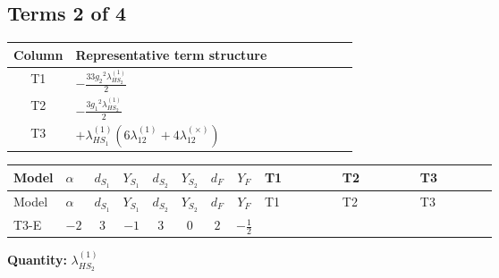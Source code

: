 \documentclass[8pt]{article}
\begin{document}
\begin{landscape}
\subsection*{Terms 2 of 4}
\begin{center}
\begin{tabular}{@{}c >{\raggedright\arraybackslash}p{0.82\linewidth}@{}}
\toprule
Column & Representative term structure \\
\midrule
T1 & \(\displaystyle -\frac{33 {g_2}^2 {\lambda_{HS_2}^{(1)}}}{2}\) \\
\midrule
T2 & \(\displaystyle -\frac{3 {g_1}^2 {\lambda_{HS_2}^{(1)}}}{2}\) \\
\midrule
T3 & \(\displaystyle +{\lambda_{HS_1}^{(1)}} (6 {\lambda_{12}^{(1)}}+4 {\lambda_{12}^{(\times)}})\) \\
\midrule
\bottomrule
\end{tabular}
\end{center}
\smallskip
\tiny
\begin{longtable}{@{}llcccccc >{\raggedright\arraybackslash}p{0.21\linewidth} >{\raggedright\arraybackslash}p{0.21\linewidth} >{\raggedright\arraybackslash}p{0.21\linewidth}@{}}
\toprule
Model & $\alpha$ & $d_{S_1}$ & $Y_{S_1}$ & $d_{S_2}$ & $Y_{S_2}$ & $d_F$ & $Y_F$ & T1 & T2 & T3 \\
\midrule
\endfirsthead
\toprule
Model & $\alpha$ & $d_{S_1}$ & $Y_{S_1}$ & $d_{S_2}$ & $Y_{S_2}$ & $d_F$ & $Y_F$ & T1 & T2 & T3 \\
\midrule
\endhead
T3-E & $-2$ & $3$ & $-1$ & $3$ & $0$ & $2$ & $-\frac{1}{2}$ & \scriptsize\adjustbox{max width=\linewidth}{$\begin{gathered} -\frac{33 {g_2}^2 {\lambda_{HS_2}^{(1)}}}{2}\end{gathered}$} & \scriptsize\adjustbox{max width=\linewidth}{$\begin{gathered} -\frac{3 {g_1}^2 {\lambda_{HS_2}^{(1)}}}{2}\end{gathered}$} & \scriptsize\adjustbox{max width=\linewidth}{$\begin{gathered} +{\lambda_{HS_1}^{(1)}} (6 {\lambda_{12}^{(1)}}+4 {\lambda_{12}^{(\times)}})\end{gathered}$} \\
\midrule
\bottomrule
\end{longtable}
\clearpage
\noindent\textbf{Quantity: }$\lambda_{HS_2}^{(1)}$\par\smallskip

\end{landscape}
\end{document}

